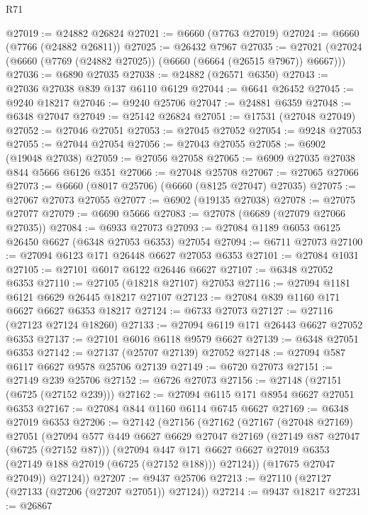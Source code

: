 \begin{lexlean}{R71}
\begin{coremodule}
@27019 := @24882 @26824
@27021 := @6660 (@7763 @27019)
@27024 := @6660 (@7766 (@24882 @26811))
@27025 := @26432 @7967
@27035 := @27021 (@27024 (@6660 (@7769 (@24882 @27025)) (@6660 (@6664 (@26515 @7967)) @6667)))
@27036 := @6890 @27035
@27038 := @24882 (@26571 @6350)
@27043 := @27036 @27038 @839 @137 @6110 @6129
@27044 := @6641 @26452
@27045 := @9240 @18217
@27046 := @9240 @25706
@27047 := @24881 @6359
@27048 := @6348 @27047
@27049 := @25142 @26824
@27051 := @17531 (@27048 @27049)
@27052 := @27046 @27051
@27053 := @27045 @27052
@27054 := @9248 @27053
@27055 := @27044 @27054
@27056 := @27043 @27055
@27058 := @6902 (@19048 @27038)
@27059 := @27056 @27058
@27065 := @6909 @27035 @27038 @844 @5666 @6126 @351
@27066 := @27048 @25708
@27067 := @27065 @27066
@27073 := @6660 (@8017 @25706) (@6660 (@8125 @27047) @27035)
@27075 := @27067 @27073 @27055
@27077 := @6902 (@19135 @27038)
@27078 := @27075 @27077
@27079 := @6690 @5666
@27083 := @27078 (@6689 (@27079 @27066 @27035))
@27084 := @6933 @27073
@27093 := @27084 @1189 @6053 @6125 @26450 @6627 (@6348 @27053 @6353) @27054
@27094 := @6711 @27073
@27100 := @27094 @6123 @171 @26448 @6627 @27053 @6353
@27101 := @27084 @1031
@27105 := @27101 @6017 @6122 @26446 @6627
@27107 := @6348 @27052 @6353
@27110 := @27105 (@18218 @27107) @27053
@27116 := @27094 @1181 @6121 @6629 @26445 @18217 @27107
@27123 := @27084 @839 @1160 @171 @6627 @6627 @6353 @18217
@27124 := @6733 @27073
@27127 := @27116 (@27123 @27124 @18260)
@27133 := @27094 @6119 @171 @26443 @6627 @27052 @6353
@27137 := @27101 @6016 @6118 @9579 @6627
@27139 := @6348 @27051 @6353
@27142 := @27137 (@25707 @27139) @27052
@27148 := @27094 @587 @6117 @6627 @9578 @25706 @27139
@27149 := @6720 @27073
@27151 := @27149 @239 @25706
@27152 := @6726 @27073
@27156 := @27148 (@27151 (@6725 (@27152 @239)))
@27162 := @27094 @6115 @171 @8954 @6627 @27051 @6353
@27167 := @27084 @844 @1160 @6114 @6745 @6627
@27169 := @6348 @27019 @6353
@27206 := @27142
    (@27156
      (@27162
        (@27167
          (@27048 @27169)
          @27051
          (@27094
            @577
            @449
            @6627
            @6629
            @27047
            @27169
            (@27149 @87 @27047 (@6725 (@27152 @87)))
            (@27094
              @447
              @171
              @6627
              @6627
              @27019
              @6353
              (@27149 @188 @27019 (@6725 (@27152 @188)))
              @27124))
          (@17675 @27047 @27049))
        @27124))
@27207 := @9437 @25706
@27213 := @27110 (@27127 (@27133 (@27206 (@27207 @27051)) @27124))
@27214 := @9437 @18217
@27231 := @26867

\end{coremodule}
\end{lexlean}

